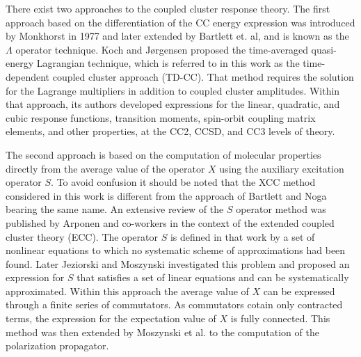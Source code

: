 \documentclass[preprint,12pt]{elsarticle}
\begin{document}
There exist two approaches to the coupled cluster response theory. 
The first approach based on 
the differentiation of the CC energy expression was introduced by
Monkhorst in 1977\cite{monkhorst1977calculation, dalgaard1983some} and 
later extended by Bartlett et. al,\cite{jorgensen2012geometrical, fitzgerald1986analytic, salter1987property, salter1989analytic}
and is known as the $\Lambda$ operator technique.
Koch and J{\o}rgensen\cite{jo1988mo, helgaker1989configuration, koch1990coupled}
proposed the time-averaged quasi-energy Lagrangian technique, which is referred to in this work
as the time-dependent coupled cluster approach (TD-CC). That method requires the solution for the  Lagrange multipliers
in addition to coupled cluster amplitudes.
Within that approach, its authors developed expressions for the linear,
quadratic, and cubic response functions,\cite{christiansen1998response}
transition moments,\cite{christiansen1998integral} spin-orbit
coupling matrix elements,\cite{christiansen2002radiative, helmich2016spin}
and other properties,\cite{helgaker2012recent}
at the CC2,\cite{christiansen1995second, hald2000linear} CCSD,\cite{koch1994caclculation} and 
CC3 levels of theory.\cite{koch1997cc3, hald2002calculation} 


The second approach is based on the computation of molecular properties
directly from  the average value of the operator $X$ using the auxiliary excitation operator $S$.
To avoid confusion it should be noted that the XCC method considered in this work is different from the approach of
Bartlett and Noga\cite{bartlett1988expectation} bearing the same name.
An extensive review of the $S$ operator method was published 
by Arponen and co-workers in the context of the extended coupled cluster theory (ECC).\cite{arponen1983variational, arponen1987extended, bishop1990correlations}
The  operator $S$ is defined in that work  by
a set of  nonlinear equations to which no systematic scheme of approximations had been found.
Later Jeziorski and Moszynski\cite{jeziorski1993explicitly} investigated this problem and
proposed an expression for $S$  that satisfies a set of  linear equations and can be systematically approximated. Within this approach the
average value of $X$ can be expressed through a finite series of commutators. As commutators cotain only contracted terms, the expression for
 the expectation value of $X$ is fully connected.
 This method was then extended by Moszynski et al. \cite{moszynski2005time} to the computation of the polarization propagator.
\end{document}
